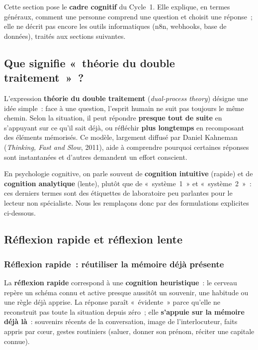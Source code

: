 \documentclass[a4paper,12pt]{report}
\begin{document}
	Cette section pose le \textbf{cadre cognitif} du Cycle~1. Elle explique, en termes
	généraux, comment une personne comprend une question et choisit une réponse~; elle ne
	décrit pas encore les outils informatiques (n8n, webhooks, base de données), traités
	aux sections suivantes.
	
	\subsection{Que signifie «~théorie du double traitement~»~?}
	
	L'expression \textbf{théorie du double traitement} (\textit{dual-process theory}) désigne
	une idée simple~: face à une question, l'esprit humain ne suit pas toujours le même
	chemin. Selon la situation, il peut répondre \textbf{presque tout de suite} en s'appuyant
	sur ce qu'il sait déjà, ou réfléchir \textbf{plus longtemps} en recomposant des
	éléments mémorisés. Ce modèle, largement diffusé par Daniel Kahneman
	(\textit{Thinking, Fast and Slow}, 2011), aide à comprendre pourquoi certaines réponses
	sont instantanées et d'autres demandent un effort conscient.
	
	En psychologie cognitive, on parle souvent de \textbf{cognition intuitive} (rapide) et de
	\textbf{cognition analytique} (lente), plutôt que de «~système~1~» et «~système~2~»~:
	ces derniers termes sont des étiquettes de laboratoire peu parlantes pour le lecteur
	non spécialiste. Nous les remplaçons donc par des formulations explicites ci-dessous.
	
	\subsection{Réflexion rapide et réflexion lente}
	
	\subsubsection{Réflexion rapide~: réutiliser la mémoire déjà présente}
	
	La \textbf{réflexion rapide} correspond à une \textbf{cognition heuristique}~: le cerveau
	repère un schéma connu et active presque aussitôt un souvenir, une habitude ou une
	règle déjà apprise. La réponse paraît «~évidente~» parce qu'elle ne reconstruit pas
	toute la situation depuis zéro~; elle \textbf{s'appuie sur la mémoire déjà là}~:
	souvenirs récents de la conversation, image de l'interlocuteur, faits appris par cœur,
	gestes routiniers (saluer, donner son prénom, réciter une capitale connue).
	
\end{document}
